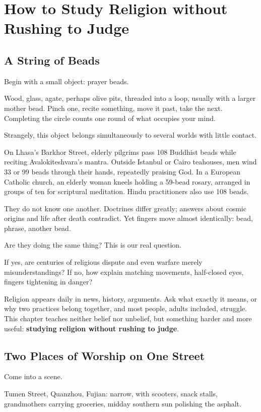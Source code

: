 \chapter[Studying Religion before Judging]{How to Study Religion without Rushing to Judge}
\section{A String of Beads}
Begin with a small object: prayer beads.

Wood, glass, agate, perhaps olive pits, threaded into a loop, usually with a larger mother bead. Pinch one, recite something, move it past, take the next. Completing the circle counts one round of what occupies your mind.

Strangely, this object belongs simultaneously to several worlds with little contact.

On Lhasa's Barkhor Street, elderly pilgrims pass 108 Buddhist beads while reciting Avalokiteshvara's mantra. Outside Istanbul or Cairo teahouses, men wind 33 or 99 beads through their hands, repeatedly praising God. In a European Catholic church, an elderly woman kneels holding a 59-bead rosary, arranged in groups of ten for scriptural meditation. Hindu practitioners also use 108 beads.

They do not know one another. Doctrines differ greatly; answers about cosmic origins and life after death contradict. Yet fingers move almost identically: bead, phrase, another bead.

Are they doing the same thing? This is our real question.

If yes, are centuries of religious dispute and even warfare merely misunderstandings? If no, how explain matching movements, half-closed eyes, fingers tightening in danger?

Religion appears daily in news, history, arguments. Ask what exactly it means, or why two practices belong together, and most people, adults included, struggle. This chapter teaches neither belief nor unbelief, but something harder and more useful: \textbf{studying religion without rushing to judge}.

\section{Two Places of Worship on One Street}
Come into a scene.

Tumen Street, Quanzhou, Fujian: narrow, with scooters, snack stalls, grandmothers carrying groceries, midday southern sun polishing the asphalt.

